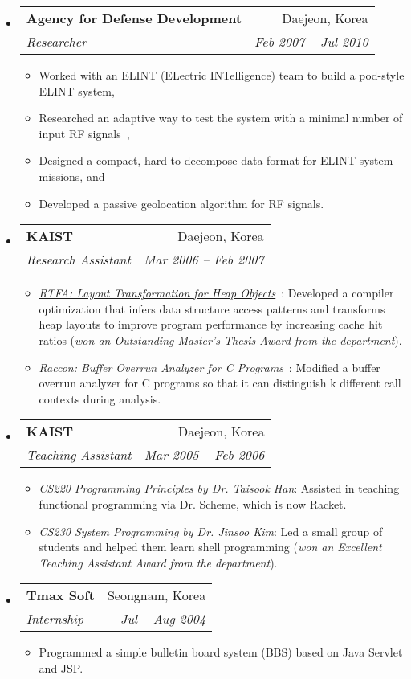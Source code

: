 \documentclass[letterpaper,11pt]{article}
\makeatletter
\newcommand{\ressubheading}[4]{
\begin{tabular*}{6.5in}{l@{\extracolsep{\fill}}r}
    \textbf{#1} & #2 \\
    \textit{#3} & \textit{#4} \\
\end{tabular*}\vspace{-6pt}}
\makeatother
\begin{document}
\begin{itemize}
    \item
      \ressubheading{{Agency for Defense Development}}{Daejeon, Korea}{Researcher}{Feb 2007 -- Jul 2010}
        {
\small
        \begin{itemize}
\item Worked with an ELINT (ELectric INTelligence) team to build a pod-style ELINT system,
\item Researched an adaptive way to test the system with
a minimal number of input RF signals~\cite{valid09},
\item Designed a compact, hard-to-decompose data format for ELINT system missions, and
\item Developed a passive geolocation algorithm for RF signals.
        \end{itemize}
        }
    \item
      \ressubheading{{KAIST}}{Daejeon, Korea}{Research Assistant}{Mar 2006 -- Feb 2007}
        {
\small
        \begin{itemize}
\item\emph{\href{https://github.com/jsjeon/rtfa}{RTFA: Layout Transformation for Heap Objects}}~\cite{TACO09, cc07}:
Developed a compiler optimization that infers data structure access patterns
and transforms heap layouts to improve program performance
by increasing cache hit ratios
(\emph{won an Outstanding Master's Thesis Award from the department}).
\item\emph{Raccon: Buffer Overrun Analyzer for C Programs}~\cite{KIISE05, kcc06}:
Modified a buffer overrun analyzer for C programs so that
it can distinguish k different call contexts during analysis.
        \end{itemize}
        }
    \item
      \ressubheading{KAIST}{Daejeon, Korea}{Teaching Assistant}{Mar 2005 -- Feb 2006}
        {
\small
        \begin{itemize}
\item\emph{CS220 Programming Principles by Dr. Taisook Han}:
Assisted in teaching functional programming via Dr. Scheme, which is now Racket.
\item\emph{CS230 System Programming by Dr. Jinsoo Kim}:
Led a small group of students and helped them learn shell programming
(\emph{won an Excellent Teaching Assistant Award from the department}).
        \end{itemize}
        }
    \item
      \ressubheading{Tmax Soft}{Seongnam, Korea}{Internship}{Jul -- Aug 2004}
        {
\small
        \begin{itemize}
\item Programmed a simple bulletin board system (BBS) based on Java Servlet and JSP.
        \end{itemize}
        }
\end{itemize}  %
\end{document}
